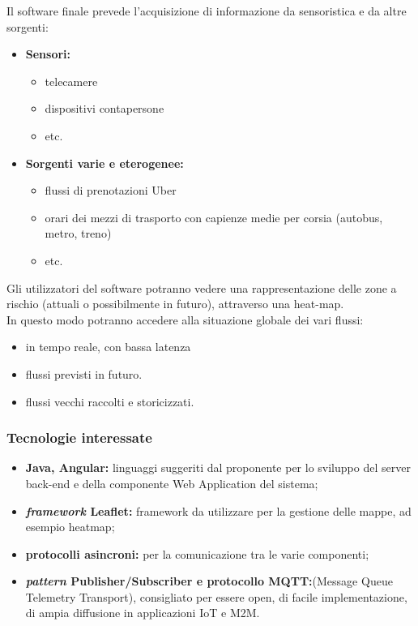 Il software finale prevede l'acquisizione di informazione da sensoristica e da altre sorgenti:
\begin{itemize}
	\item{\textbf{Sensori:}}
	    \begin{itemize}
	        \item telecamere
	        \item dispositivi contapersone
	        \item etc.
	    \end{itemize}
	\item{\textbf{Sorgenti varie e eterogenee:}}
	    \begin{itemize}
	        \item flussi di prenotazioni Uber
	        \item orari dei mezzi di trasporto con capienze medie per corsia (autobus, metro, treno)
	        \item etc.
	\end{itemize}
\end{itemize}
Gli utilizzatori del software potranno vedere una rappresentazione delle zone a rischio (attuali o possibilmente in futuro), attraverso una heat-map.\\
In questo modo potranno accedere alla situazione globale dei vari flussi:
\begin{itemize}
    \item in tempo reale, con bassa latenza
    \item flussi previsti in futuro.
    \item flussi vecchi raccolti e storicizzati.
\end{itemize}


\subsubsection{Tecnologie interessate}

\begin{itemize}
	\item{\textbf{Java, Angular:}} linguaggi suggeriti dal proponente per lo sviluppo del server back-end e della componente Web Application del sistema;
	\item{\textbf{\textit{framework} Leaflet:}} framework da utilizzare per la gestione delle mappe, ad esempio heatmap;
	\item{\textbf{protocolli asincroni:}} per la comunicazione tra le varie componenti;
	\item{\textbf{\textit{pattern} Publisher/Subscriber e protocollo MQTT:}}\newline (Message Queue Telemetry Transport), consigliato per essere open, di facile implementazione, di ampia diffusione in applicazioni IoT e M2M.
\end{itemize}

